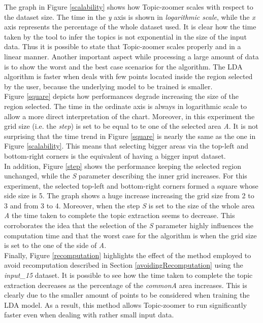\documentclass{sig-alternate-05-2015}
\begin{document}
The graph in Figure \ref{scalability} shows how Topic-zoomer scales with respect to the dataset size. The time in the \emph{y} axis is shown in \emph{logarithmic scale}, while the \emph{x} axis represents the percentage of the whole dataset used. It is clear how the time taken by the tool to infer the topics is not exponential in the size of the input data. Thus it is possible to state that Topic-zoomer scales properly and in a linear manner.  
Another important aspect while processing a large amount of data is to show the worst and the best case scenarios for the algorithm. The LDA algorithm is faster when deals with few points located inside the region selected by the user, because the underlying model to be trained is smaller.\\
Figure \ref{square} depicts how performances degrade increasing the size of the region selected. The time in the ordinate axis is always in logarithmic scale to allow a more direct interpretation of the chart. Moreover, in this experiment the grid size (i.e. the \emph{step}) is set to be equal to te one of the selected area \emph{A}. It is not surprising that the time trend in Figure \ref{square} is nearly the same as the one in Figure \ref{scalability}. This means that selecting bigger areas via the top-left and bottom-right corners is the equivalent of having a bigger input dataset.\\  
In addition, Figure \ref{step} shows the performance keeping the selected region unchanged, while the \emph{S} parameter describing the inner grid increases. For this experiment, the selected top-left and bottom-right corners formed a square whose side size is 5. The graph shows a huge increase increasing the grid size from 2 to 3 and from 3 to 4. Moreover, when the step \emph{S} is set to the size of the whole area \emph{A} the time taken to complete the topic extraction seems to decrease. This corroborates the idea that the selection of the \emph{S} parameter highly influences the computation time and that the worst case for the algorithm is when the grid size is set to the one of the side of \emph{A}.\\
Finally, Figure \ref{recomputation} highlights the effect of the method employed to avoid recomputation described in Section \ref{avoidingRecomputation} using the \emph{input\_15} dataset. It is possible to see how the time taken to complete the topic extraction decreases as the percentage of the \emph{commonA} area increases. This is clearly due to the smaller amount of points to be considered when training the LDA model. As a result, this method allows Topic-zoomer to run significantly faster even when dealing with rather small input data. 
\end{document}
